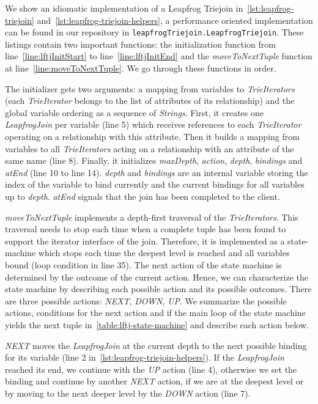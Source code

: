 We show an idiomatic implementation of a Leapfrog Triejoin in~\cref{lst:leapfrog-triejoin} and~\ref{lst:leapfrog-triejoin-helpers}, a performance oriented
implementation can be found in our repository in \texttt{leapfrogTriejoin.LeapfrogTriejoin}.
These listings contain two important functions: the initialization function from line~\ref{line:lftjInitStart} to
line~\ref{line:lftjInitEnd} %
and the \textit{moveToNextTuple} function at line~\ref{line:moveToNextTuple}. %
We go through these functions in order.

The initializer gets two arguments: a mapping from variables to \textit{TrieIterators} (each \textit{TrieIterator} belongs to
the list of attributes of its relationship) and the global variable ordering as a sequence of \textit{Strings}.
First, it creates one \textit{LeapfrogJoin} per variable (line 5) which receives references %
to each \textit{TrieIterator} operating on a relationship with this attribute.
Then it builds a mapping from variables to all \textit{TrieIterators} acting on a relationship with an attribute of the same name (line
8). %
Finally, it initializes \textit{maxDepth}, \textit{action}, \textit{depth}, \textit{bindings} and \textit{atEnd} (line 10 to line 14). %
\textit{depth} and \textit{bindings} are an internal variable storing the index of the variable to bind currently and the
current bindings for all variables up to \textit{depth}.
\textit{atEnd} signals that the join has been completed to the client.

\textit{moveToNextTuple} implements a depth-first traversal of the \textit{TrieIterators}.
This traversal needs to stop each time when a complete tuple has been found to support the iterator interface of the join.
Therefore, it is implemented as a state-machine which stops each time the deepest level is reached and all variables bound
(loop condition in line 35). %
The next action of the state machine is determined by the outcome of the current action.
Hence, we can characterize the state machine by describing each possible action and its possible outcomes.
There are three possible actions: \textit{NEXT}, \textit{DOWN}, \textit{UP}.
We summarize the possible actions, conditions for the next action and
if the main loop of the state machine yields the next tuple in~\cref{table:lftj-state-machine} and describe each action below.

\textit{NEXT} moves the \textit{LeapfrogJoin} at the current depth to the next possible binding for its variable
(line 2 in~\cref{lst:leapfrog-triejoin-helpers}). %
If the \textit{LeapfrogJoin} reached its end, we continue with the \textit{UP} action (line 4), %
otherwise we set the binding and continue by another \textit{NEXT} action, if we are at the deepest level or by moving
to the next deeper level by the \textit{DOWN} action (line 7). %

